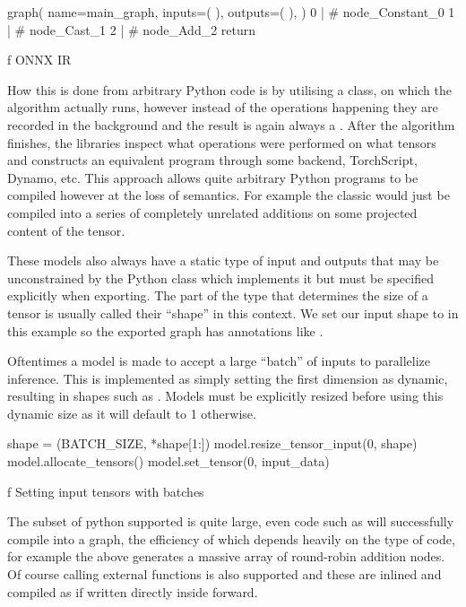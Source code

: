 \midinsert
{}
\begtt
graph(
    name=main_graph,
    inputs=(
    ),
    outputs=(
    ),
) {
    0 |  # node_Constant_0
    1 |  # node_Cast_1
    2 |  # node_Add_2
    return %
}
\endtt
\caption/f ONNX IR
\endinsert

How this is done from arbitrary Python code is by utilising
a  class,
on which the algorithm actually runs,
however instead of the operations
happening they are recorded in the background
and the result is again always a .
After the algorithm finishes,
the libraries inspect what operations were performed
on what tensors and constructs an equivalent program
through some backend, TorchScript, Dynamo, etc.
This approach allows quite arbitrary Python programs
to be compiled however at the loss of semantics.
For example the classic 
would just be compiled into a series of completely unrelated
additions on some projected content of the tensor.

These models also always have a static type of input and outputs
that may be unconstrained by the Python class which implements it
but must be specified explicitly when exporting.
The part of the type that determines the size of a tensor
is usually called their ``shape'' in this context.
We set our input shape to  in this example
so the exported graph has annotations like .

Oftentimes a model is made to accept a large ``batch'' of inputs
to parallelize inference.
This is implemented as simply
setting the first dimension as dynamic,
resulting in shapes such as .
Models must be explicitly resized before using this dynamic size
as it will default to 1 otherwise.

\midinsert
\begtt {}
shape = (BATCH_SIZE, *shape[1:])
model.resize_tensor_input(0, shape)
model.allocate_tensors()
model.set_tensor(0, input_data)
\endtt
\caption/f Setting input tensors with batches
\endinsert

The subset of python supported is quite large,
even code such as 
will successfully compile into a graph,
the efficiency of which depends heavily on
the type of code,
for example the above generates a massive
array of round-robin addition nodes.
Of course calling external functions is also supported
and these are inlined and compiled as if written
directly inside forward.

